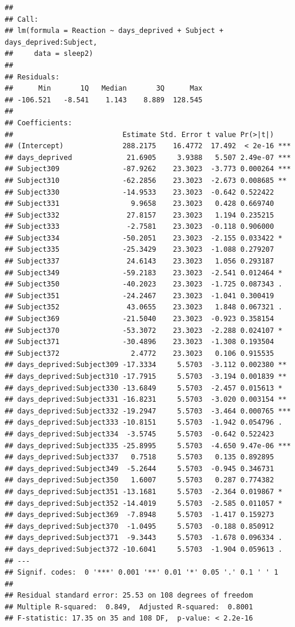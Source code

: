 \documentclass[]{book}
\begin{document}
\begin{verbatim}
## 
## Call:
## lm(formula = Reaction ~ days_deprived + Subject + days_deprived:Subject, 
##     data = sleep2)
## 
## Residuals:
##      Min       1Q   Median       3Q      Max 
## -106.521   -8.541    1.143    8.889  128.545 
## 
## Coefficients:
##                          Estimate Std. Error t value Pr(>|t|)    
## (Intercept)              288.2175    16.4772  17.492  < 2e-16 ***
## days_deprived             21.6905     3.9388   5.507 2.49e-07 ***
## Subject309               -87.9262    23.3023  -3.773 0.000264 ***
## Subject310               -62.2856    23.3023  -2.673 0.008685 ** 
## Subject330               -14.9533    23.3023  -0.642 0.522422    
## Subject331                 9.9658    23.3023   0.428 0.669740    
## Subject332                27.8157    23.3023   1.194 0.235215    
## Subject333                -2.7581    23.3023  -0.118 0.906000    
## Subject334               -50.2051    23.3023  -2.155 0.033422 *  
## Subject335               -25.3429    23.3023  -1.088 0.279207    
## Subject337                24.6143    23.3023   1.056 0.293187    
## Subject349               -59.2183    23.3023  -2.541 0.012464 *  
## Subject350               -40.2023    23.3023  -1.725 0.087343 .  
## Subject351               -24.2467    23.3023  -1.041 0.300419    
## Subject352                43.0655    23.3023   1.848 0.067321 .  
## Subject369               -21.5040    23.3023  -0.923 0.358154    
## Subject370               -53.3072    23.3023  -2.288 0.024107 *  
## Subject371               -30.4896    23.3023  -1.308 0.193504    
## Subject372                 2.4772    23.3023   0.106 0.915535    
## days_deprived:Subject309 -17.3334     5.5703  -3.112 0.002380 ** 
## days_deprived:Subject310 -17.7915     5.5703  -3.194 0.001839 ** 
## days_deprived:Subject330 -13.6849     5.5703  -2.457 0.015613 *  
## days_deprived:Subject331 -16.8231     5.5703  -3.020 0.003154 ** 
## days_deprived:Subject332 -19.2947     5.5703  -3.464 0.000765 ***
## days_deprived:Subject333 -10.8151     5.5703  -1.942 0.054796 .  
## days_deprived:Subject334  -3.5745     5.5703  -0.642 0.522423    
## days_deprived:Subject335 -25.8995     5.5703  -4.650 9.47e-06 ***
## days_deprived:Subject337   0.7518     5.5703   0.135 0.892895    
## days_deprived:Subject349  -5.2644     5.5703  -0.945 0.346731    
## days_deprived:Subject350   1.6007     5.5703   0.287 0.774382    
## days_deprived:Subject351 -13.1681     5.5703  -2.364 0.019867 *  
## days_deprived:Subject352 -14.4019     5.5703  -2.585 0.011057 *  
## days_deprived:Subject369  -7.8948     5.5703  -1.417 0.159273    
## days_deprived:Subject370  -1.0495     5.5703  -0.188 0.850912    
## days_deprived:Subject371  -9.3443     5.5703  -1.678 0.096334 .  
## days_deprived:Subject372 -10.6041     5.5703  -1.904 0.059613 .  
## ---
## Signif. codes:  0 '***' 0.001 '**' 0.01 '*' 0.05 '.' 0.1 ' ' 1
## 
## Residual standard error: 25.53 on 108 degrees of freedom
## Multiple R-squared:  0.849,	Adjusted R-squared:  0.8001 
## F-statistic: 17.35 on 35 and 108 DF,  p-value: < 2.2e-16
\end{verbatim}
\end{document}
